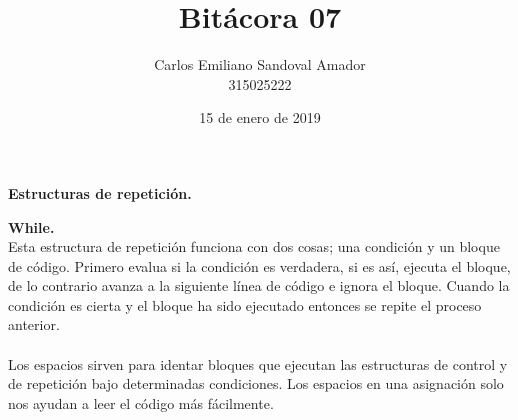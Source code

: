 \documentclass[letterpaper, 12pt, oneside]{article}%
\title{Bitácora 07}
\author{Carlos Emiliano Sandoval Amador \\ 315025222}
\date{15 de enero de 2019}
\begin{document}
	\maketitle
	\begin{center}
		\textbf{\Large Estructuras de repetición.}
	\end{center}
	\textbf{While.} \\ Esta estructura de repetición funciona con dos cosas; una condición y un bloque de código. Primero evalua si la condición es verdadera, si es así, ejecuta el bloque, de lo contrario avanza a la siguiente línea de código e ignora el bloque. Cuando la condición es cierta y el bloque ha sido ejecutado entonces se repite el proceso anterior.  \\ \\ Los espacios sirven para identar bloques que ejecutan las estructuras de control y de repetición bajo determinadas condiciones. Los espacios en una asignación solo nos ayudan a leer el código más fácilmente.
\end{document}
